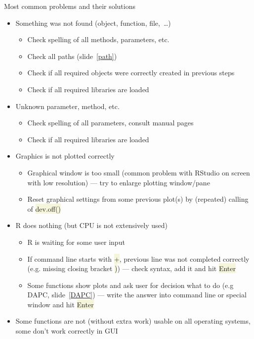\documentclass[compress, xelatex, 11pt, xcolor=svgnames, aspectratio=169, url={hyphens, lowtilde}]{beamer}
\renewcommand{\texttt}[1]{\colorbox{Beige}{{\ttfamily #1}}}
\begin{document}
\begin{frame}[allowframebreaks]{Most common problems and their solutions}
	\label{problems}
	\begin{itemize}
		\item Something was not found (object, function, file,~\ldots)
		\begin{itemize}
			\item Check spelling of all methods, parameters, etc.
			\item Check all paths (slide~\ref{path})
			\item Check if all required objects were correctly created in previous steps
			\item Check if all required libraries are loaded
		\end{itemize}
		\item Unknown parameter, method, etc.
		\begin{itemize}
			\item Check spelling of all parameters, consult manual pages
			\item Check if all required libraries are loaded
		\end{itemize}
		\item Graphics is not plotted correctly
		\begin{itemize}
			\item Graphical window is too small (common problem with RStudio on screen with low resolution) --- try to enlarge plotting window/pane
			\item Reset graphical settings from some previous plot(s) by (repeated) calling of \texttt{dev.off()}
		\end{itemize}
		\item R does nothing (but CPU is not extensively used)
		\begin{itemize}
			\item R is waiting for some user input
			\item If command line starts with \texttt{+}, previous line was not completed correctly (e.g. missing closing bracket \texttt{)}) --- check syntax, add it and hit \texttt{Enter}
			\item Some functions show plots and ask user for decision what to do (e.g DAPC, slide~\ref{DAPC}) --- write the answer into command line or special window and hit \texttt{Enter}
		\end{itemize}
		\item Some functions are not (without extra work) usable on all operating systems, some don't work correctly in GUI

\end{itemize}
\end{frame}
\end{document}
